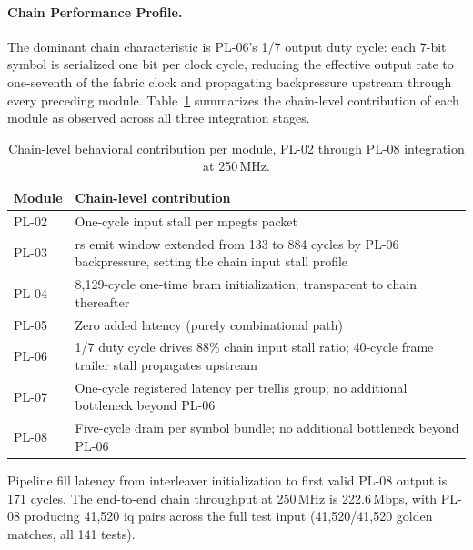 \FloatBarrier
\paragraph{Chain Performance Profile.}
\leavevmode\par

The dominant chain characteristic is PL-06's 1/7 output duty
cycle: each 7-bit symbol is serialized one bit per clock cycle,
reducing the effective output rate to one-seventh of the fabric
clock and propagating backpressure upstream through every preceding
module.
Table~\ref{tab:chain_profile} summarizes the chain-level
contribution of each module as observed across all three integration
stages.

\begin{table}[htbp]
  \caption{Chain-level behavioral contribution per module,
           PL-02 through PL-08 integration at 250\,MHz.}
  \label{tab:chain_profile}
  \centering
  \small
  \begin{tabular}{lp{9.5cm}}
    \hline
    Module & Chain-level contribution \\
    \hline
    PL-02 & One-cycle input stall per \ac{mpegts} packet \\[2pt]
    PL-03 & \ac{rs} emit window extended from 133 to 884 cycles
            by PL-06 backpressure, setting the chain input
            stall profile \\[2pt]
    PL-04 & 8,129-cycle one-time \ac{bram} initialization;
            transparent to chain thereafter \\[2pt]
    PL-05 & Zero added latency (purely combinational path) \\[2pt]
    PL-06 & 1/7 duty cycle drives 88\% chain input stall ratio;
            40-cycle frame trailer stall propagates upstream \\[2pt]
    PL-07 & One-cycle registered latency per trellis group;
            no additional bottleneck beyond PL-06 \\[2pt]
    PL-08 & Five-cycle drain per symbol bundle;
            no additional bottleneck beyond PL-06 \\
    \hline
  \end{tabular}
\end{table}

Pipeline fill latency from interleaver initialization to first valid
PL-08 output is 171 cycles.
The end-to-end chain throughput at 250\,MHz is 222.6\,Mbps,
with PL-08 producing 41,520 \ac{iq} pairs across the full test
input (41,520/41,520 golden matches, all 141 tests).

